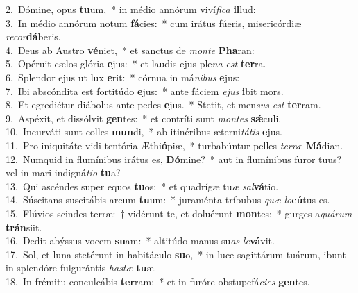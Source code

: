 {2.~}Dómine, opus \textbf{tu}um,~* in médio annórum viví\textit{fi}\textit{ca} \textbf{il}lud:\\
{3.~}In médio annórum notum \textbf{fá}cies:~* cum irátus fúeris, misericórdiæ \textit{re}\textit{cor}\textbf{dá}beris.\\
{4.~}Deus ab Austro \textbf{vé}niet,~* et sanctus de \textit{mon}\textit{te} \textbf{Pha}ran:\\
{5.~}Opéruit cælos glória \textbf{e}jus:~* et laudis ejus ple\textit{na} \textit{est} \textbf{ter}ra.\\
{6.~}Splendor ejus ut lux \textbf{e}rit:~* córnua in má\textit{ni}\textit{bus} \textbf{e}jus:\\
{7.~}Ibi abscóndita est fortitúdo \textbf{e}jus:~* ante fáciem \textit{e}\textit{jus} \textbf{i}bit mors.\\
{8.~}Et egrediétur diábolus ante pedes \textbf{e}jus.~* Stetit, et men\textit{sus} \textit{est} \textbf{ter}ram.\\
{9.~}Aspéxit, et dissólvit \textbf{gen}tes:~* et contríti sunt \textit{mon}\textit{tes} \textbf{sǽ}culi.\\
{10.~}Incurváti sunt colles \textbf{mun}di,~* ab itinéribus æterni\textit{tá}\textit{tis} \textbf{e}jus.\\
{11.~}Pro iniquitáte vidi tentória Æthi\textbf{ó}piæ,~* turbabúntur pelles \textit{ter}\textit{ræ} \textbf{Má}dian.\\
{12.~}Numquid in flumínibus irátus es, \textbf{Dó}mine?~* aut in flumínibus furor tuus? vel in mari indigná\textit{ti}\textit{o} \textbf{tu}a?\\
{13.~}Qui ascéndes super equos \textbf{tu}os:~* et quadrígæ tu\textit{æ} \textit{sal}\textbf{vá}tio.\\
{14.~}Súscitans suscitábis arcum \textbf{tu}um:~* juraménta tríbubus \textit{quæ} \textit{lo}\textbf{cú}tus es.\\
{15.~}Flúvios scindes terræ:~† vidérunt te, et doluérunt \textbf{mon}tes:~* gurges a\textit{quá}\textit{rum} \textbf{trán}siit.\\
{16.~}Dedit abýssus vocem \textbf{su}am:~* altitúdo manus su\textit{as} \textit{le}\textbf{vá}vit.\\
{17.~}Sol, et luna stetérunt in habitáculo \textbf{su}o,~* in luce sagittárum tuárum, ibunt in splendóre fulgurántis \textit{ha}\textit{stæ} \textbf{tu}æ.\\
{18.~}In frémitu conculcábis \textbf{ter}ram:~* et in furóre obstupefá\textit{ci}\textit{es} \textbf{gen}tes.\\
